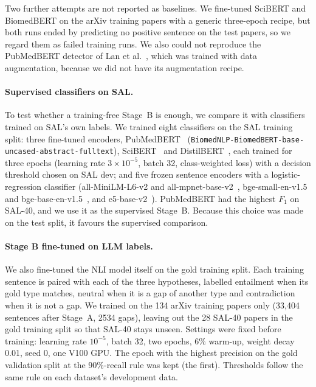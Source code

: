 Two further attempts are not reported as baselines. We fine-tuned SciBERT and BiomedBERT on the arXiv training papers with a generic three-epoch recipe, but both runs ended by predicting no positive sentence on the test papers, so we regard them as failed training runs. We also could not reproduce the PubMedBERT detector of Lan et al.~\cite{lan2024automatic}, which was trained with data augmentation, because we did not have its augmentation recipe.

\paragraph{Supervised classifiers on SAL.} To test whether a training-free Stage~B is enough, we compare it with classifiers trained on SAL's own labels. We trained eight classifiers on the SAL training split: three fine-tuned encoders, PubMedBERT~\cite{gu2021pubmedbert} (\texttt{BiomedNLP-\allowbreak BiomedBERT-\allowbreak base-\allowbreak uncased-\allowbreak abstract-\allowbreak fulltext}), SciBERT~\cite{beltagy2019scibert} and DistilBERT~\cite{sanh2019distilbert}, each trained for three epochs (learning rate $3\times10^{-5}$, batch 32, class-weighted loss) with a decision threshold chosen on SAL dev; and five frozen sentence encoders with a logistic-regression classifier (all-MiniLM-L6-v2 and all-mpnet-base-v2~\cite{reimers2019sentencebert}, bge-small-en-v1.5 and bge-base-en-v1.5~\cite{xiao2023cpack}, and e5-base-v2~\cite{wang2022e5}). PubMedBERT had the highest $F_1$ on SAL-40, and we use it as the supervised Stage~B. Because this choice was made on the test split, it favours the supervised comparison.

\paragraph{Stage B fine-tuned on LLM labels.} We also fine-tuned the NLI model itself on the gold training split. Each training sentence is paired with each of the three hypotheses, labelled entailment when its gold type matches, neutral when it is a gap of another type and contradiction when it is not a gap. We trained on the 134 arXiv training papers only (33,404 sentences after Stage~A, 2534 gaps), leaving out the 28 SAL-40 papers in the gold training split so that SAL-40 stays unseen. Settings were fixed before training: learning rate $10^{-5}$, batch 32, two epochs, 6\% warm-up, weight decay 0.01, seed 0, one V100 GPU. The epoch with the highest precision on the gold validation split at the 90\%-recall rule was kept (the first). Thresholds follow the same rule on each dataset's development data.

